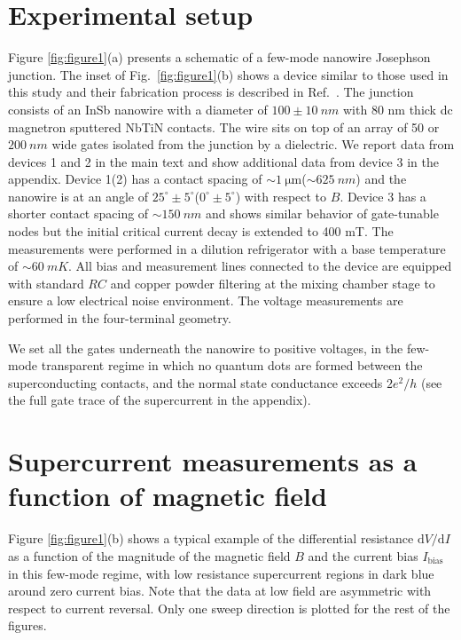 \section{Experimental setup}
Figure \ref{fig:figure1}(a) presents a schematic of a few-mode nanowire Josephson junction.
The inset of Fig.~\ref{fig:figure1}(b) shows a device similar to those used in this study and their fabrication process is described in Ref.~\cite{Mourik2012}.
The junction consists of an InSb nanowire with a diameter of $100 \pm \SI{10}{nm}$ with 80 nm thick dc magnetron sputtered NbTiN contacts.
The wire sits on top of an array of 50 or $\SI{200}{nm}$ wide gates isolated from the junction by a dielectric.
We report data from devices 1 and 2 in the main text and show additional data from device 3 in the appendix.
Device 1(2) has a contact spacing of $\sim \SI{1}{\micro \m}$($\sim \SI{625}{nm}$) and the nanowire is at an angle of $25^\circ \pm 5^\circ$($0^\circ \pm 5^\circ$) with respect to $B$.
Device 3 has a shorter contact spacing of $\sim \SI{150}{nm}$ and shows similar behavior of gate-tunable nodes but the initial critical current decay is extended to 400 mT.
The measurements were performed in a dilution refrigerator with a base temperature of $\sim\SI{60}{mK}$.
All bias and measurement lines connected to the device are equipped with standard $RC$ and copper powder filtering at the mixing chamber stage to ensure a low electrical noise environment.
The voltage measurements are performed in the four-terminal geometry.

We set all the gates underneath the nanowire to positive voltages, in the few-mode transparent regime in which no quantum dots are formed between the superconducting contacts, and the normal state conductance exceeds $2e^2/h$ (see the full gate trace of the supercurrent in the appendix).

\section{Supercurrent measurements as a function of magnetic field}
Figure \ref{fig:figure1}(b) shows a typical example of the differential resistance $\mathrm{d}V/\mathrm{d}I$ as a function of the magnitude of the magnetic field $B$ and the current bias $I_\mathrm{bias}$ in this few-mode regime, with low resistance supercurrent regions in dark blue around zero current bias.
Note that the data at low field are asymmetric with respect to current reversal.
Only one sweep direction is plotted for the rest of the figures.

